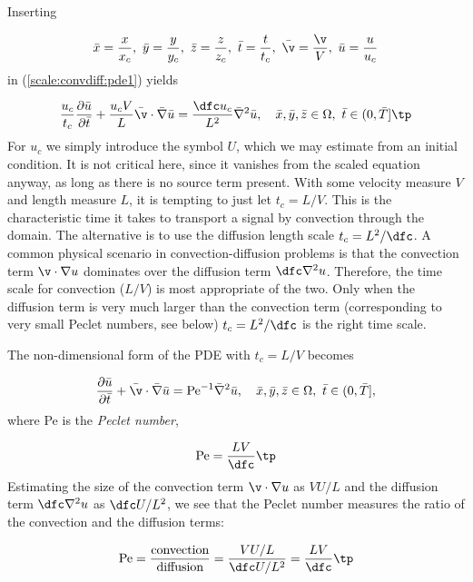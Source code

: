 \documentclass[graybox,envcountchap,sectrefs,final]{svmonodo}
\begin{document}
\vspace{3mm}




\vspace{3mm}



Inserting

\[ \bar x = \frac{x}{x_c},\ \bar y = \frac{y}{y_c},\ \bar z = \frac{z}{z_c},
\ \bar t = \frac{t}{t_c}, \ \bar\v = \frac{\v}{V},
\ \bar u =\frac{u}{u_c}\]
in (\ref{scale:convdiff:pde1}) yields

\[
\frac{u_c}{t_c}
\frac{\partial \bar u}{\partial \bar t} +
\frac{u_c V}{L}\bar\v\cdot\bar\nabla\bar u =
\frac{\dfc u_c}{L^2}\bar\nabla^2\bar u,
\quad \bar x,\bar y,\bar z\in \Omega,\ \bar t\in (0,\bar T]\tp
\]
For $u_c$ we simply introduce the symbol $U$, which we may estimate
from an initial condition. It is not critical here, since it vanishes
from the scaled equation anyway, as long as there is no source term
present.
With some velocity measure $V$ and length measure $L$, it is
tempting to just let $t_c = L/V$. This is the characteristic time it takes to
transport a signal by convection through the domain.
The alternative is to use the
diffusion length scale $t_c=L^2/\dfc$. A common physical scenario in
convection-diffusion problems is that
the convection term $\v\cdot\nabla u$ dominates over the
diffusion term $\dfc\nabla^2 u$. Therefore, the time scale for convection
($L/V$)
is most appropriate of the two. Only when
the diffusion term is very much larger than the convection
term (corresponding to very small Peclet numbers, see below)
$t_c=L^2/\dfc$ is the right time scale.

The non-dimensional form of the PDE with $t_c=L/V$ becomes

\begin{equation}
\frac{\partial \bar u}{\partial \bar t} +
\bar\v\cdot\bar\nabla\bar u =
\hbox{Pe}^{-1}\bar\nabla^2\bar u,
\quad \bar x,\bar y,\bar z\in \Omega,\ \bar t\in (0,\bar T],
\label{scale:convdiff:pde1:d}
\end{equation}
where Pe is the \emph{Peclet number},

\[ \hbox{Pe} = \frac{LV}{\dfc}\tp\]
Estimating the size of the convection term $\v\cdot\nabla u$ as
$VU/L$ and the diffusion term $\dfc\nabla^2 u$ as $\dfc U/L^2$,
we see that the Peclet number measures the ratio of the convection
and the diffusion terms:

\[ \hbox{Pe} = \frac{\hbox{convection}}{\hbox{diffusion}} =
\frac{VU/L}{\dfc U/L^2}= \frac{LV}{\dfc}\tp
\]
\end{document}
